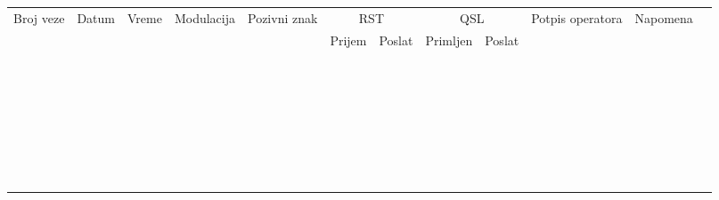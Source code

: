 \documentclass[a4paper, landscape, 11pt]{report}
\begin{document}
\begin{table}[h!]
\centering
\begin{tabular}{|c|c|c|c|c|c|c|c|c|c|c|c|}
\hline
\multirow{2}{*}{Broj veze} & \multirow{2}{*}{Datum} & \multirow{2}{*}{Vreme} & \multirow{2}{*}{Modulacija} & \multirow{2}{*}{Pozivni znak} & \multicolumn{2}{c|}{RST} & \multicolumn{2}{c|}{QSL} & \multirow{2}{*}{Potpis operatora} & \multirow{2}{*}{Napomena}\\\cline{6-9}
& & & & & Prijem & Poslat & Primljen& Poslat& &\\\hline
&&&&&&&&&&\\\hline
&&&&&&&&&&\\\hline
&&&&&&&&&&\\\hline
&&&&&&&&&&\\\hline
&&&&&&&&&&\\\hline
&&&&&&&&&&\\\hline
&&&&&&&&&&\\\hline
&&&&&&&&&&\\\hline
&&&&&&&&&&\\\hline
&&&&&&&&&&\\\hline
&&&&&&&&&&\\\hline
&&&&&&&&&&\\\hline
&&&&&&&&&&\\\hline
&&&&&&&&&&\\\hline
&&&&&&&&&&\\\hline
&&&&&&&&&&\\\hline
&&&&&&&&&&\\\hline
&&&&&&&&&&\\\hline
&&&&&&&&&&\\\hline
&&&&&&&&&&\\\hline
&&&&&&&&&&\\\hline
&&&&&&&&&&\\\hline
&&&&&&&&&&\\\hline
&&&&&&&&&&\\\hline
&&&&&&&&&&\\\hline
&&&&&&&&&&\\\hline
&&&&&&&&&&\\\hline
&&&&&&&&&&\\\hline
&&&&&&&&&&\\\hline
&&&&&&&&&&\\\hline

\end{tabular}
\thispagestyle{empty}
\mbox{}
\end{table}
\end{document}
